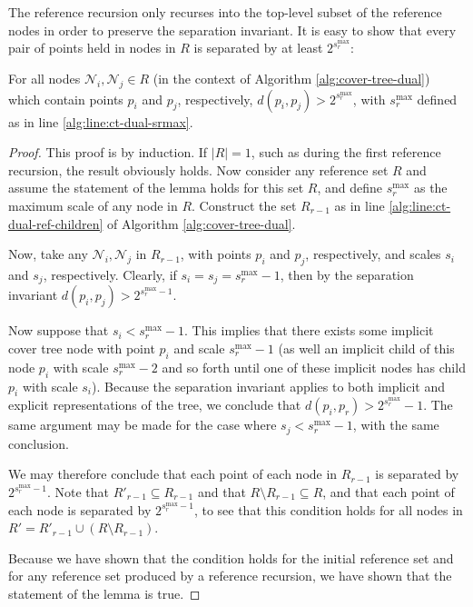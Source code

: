 The reference recursion only recurses into the top-level subset of the reference
nodes in order to preserve the separation invariant.  It is easy to show that
every pair of points held in nodes in $R$ is separated by at least
$2^{s_r^{\max}}$:

\begin{lemma}
For all nodes $\mathscr{N}_i, \mathscr{N}_j \in R$ (in the context of Algorithm
\ref{alg:cover-tree-dual}) which contain points $p_i$ and $p_j$, respectively,
$d(p_i, p_j) > 2^{s_r^{\max}}$, with $s_r^{\max}$ defined as in line
\ref{alg:line:ct-dual-srmax}.
\end{lemma}

\begin{proof}
This proof is by induction.  If $|R| = 1$, such as during the first reference
recursion, the result obviously holds.  Now consider any reference set $R$ and
assume the statement of the lemma holds for this set $R$, and define
$s_r^{\max}$ as the maximum scale of any node in $R$.  Construct the set
$R_{r - 1}$ as in line \ref{alg:line:ct-dual-ref-children} of Algorithm
\ref{alg:cover-tree-dual}.

Now, take any $\mathscr{N}_i, \mathscr{N}_j$ in $R_{r - 1}$, with points $p_i$
and $p_j$, respectively, and scales $s_i$ and $s_j$, respectively.  Clearly, if
$s_i = s_j = s_r^{\max} - 1$, then by the separation invariant $d(p_i, p_j) >
2^{s_r^{\max} - 1}$.

Now suppose that $s_i < s_r^{\max} - 1$.  This implies that there exists some
implicit cover tree node with point $p_i$ and scale $s_r^{\max} - 1$ (as well an
implicit child of this node $p_i$ with scale $s_r^{\max} - 2$ and so forth until
one of these implicit nodes has child $p_i$ with scale $s_i$).  Because the
separation invariant applies to both implicit and explicit representations of
the tree, we conclude that $d(p_i, p_r) > 2^{s_r^{\max}} - 1$.  The same
argument may be made for the case where $s_j < s_r^{\max} - 1$, with the same
conclusion.

We may therefore conclude that each point of each node in $R_{r - 1}$ is
separated by $2^{s_r^{\max} - 1}$.  Note that $R'_{r - 1} \subseteq R_{r - 1}$
and that $R \setminus R_{r - 1} \subseteq R$, and that each point of each node
is separated by $2^{s_r^{\max} - 1}$, to see that this condition holds for all
nodes in $R' = R'_{r - 1} \cup (R \setminus R_{r - 1})$.

Because we have shown that the condition holds for the initial reference set and
for any reference set produced by a reference recursion, we have shown that the
statement of the lemma is true.
\end{proof}

